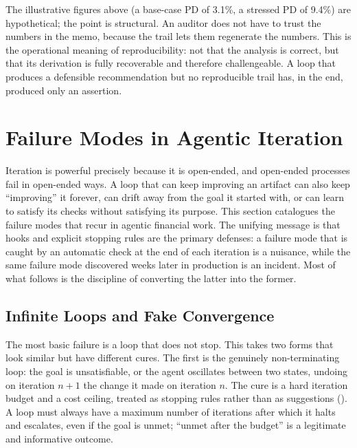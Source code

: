 The illustrative figures above (a base-case PD of 3.1\%, a stressed PD of 9.4\%)
are hypothetical; the point is structural. An auditor does not have to trust the
numbers in the memo, because the trail lets them regenerate the numbers. This is
the operational meaning of reproducibility: not that the analysis is correct, but
that its derivation is fully recoverable and therefore challengeable. A loop that
produces a defensible recommendation but no reproducible trail has, in the end,
produced only an assertion.

\section{Failure Modes in Agentic Iteration}\label{sec:failure-modes}

Iteration is powerful precisely because it is open-ended, and open-ended
processes fail in open-ended ways. A loop that can keep improving an artifact can
also keep ``improving'' it forever, can drift away from the goal it started with,
or can learn to satisfy its checks without satisfying its purpose. This section
catalogues the failure modes that recur in agentic financial work. The unifying
message is that hooks and explicit stopping rules are the primary defenses: a
failure mode that is caught by an automatic check at the end of each iteration is
a nuisance, while the same failure mode discovered weeks later in production is an
incident. Most of what follows is the discipline of converting the latter into
the former.

\subsection{Infinite Loops and Fake Convergence}\label{subsec:infinite-fake-convergence}

The most basic failure is a loop that does not stop. This takes two forms that
look similar but have different cures. The first is the genuinely non-terminating
loop: the goal is unsatisfiable, or the agent oscillates between two states,
undoing on iteration $n+1$ the change it made on iteration $n$. The cure is a
hard iteration budget and a cost ceiling, treated as stopping rules rather than
as suggestions (). A loop must always have a
maximum number of iterations after which it halts and escalates, even if the goal
is unmet; ``unmet after the budget'' is a legitimate and informative outcome.

